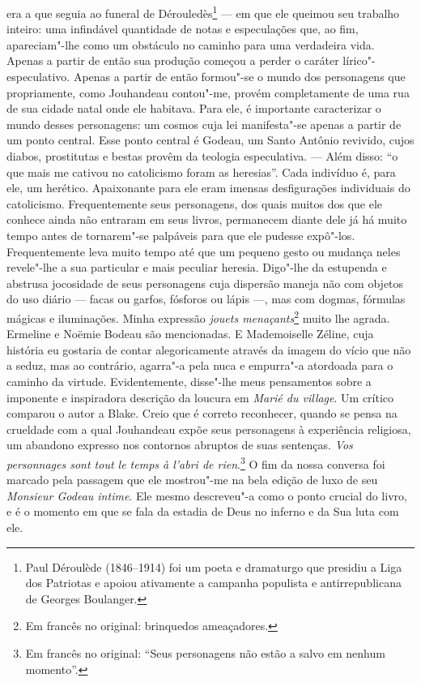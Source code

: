 era a que seguia ao funeral de Dérouledès\footnote{Paul Déroulède
  (1846--1914) foi um poeta e dramaturgo que presidiu a Liga dos Patriotas e apoiou ativamente a campanha populista e
  antirrepublicana de Georges Boulanger. \versal{[N.~O.]}} --- em que ele queimou seu
trabalho inteiro: uma infindável quantidade de notas e especulações que,
ao fim, apareciam"-lhe como um obstáculo no caminho para uma verdadeira
vida. Apenas a partir de então sua produção começou a perder o caráter
lírico"-especulativo. Apenas a partir de então formou"-se o mundo dos
personagens que propriamente, como Jouhandeau contou"-me, provém
completamente de uma rua de sua cidade natal onde ele habitava. Para
ele, é importante caracterizar o mundo desses personagens: um cosmos
cuja lei manifesta"-se apenas a partir de um ponto central. Esse ponto
central é Godeau, um Santo Antônio revivido, cujos diabos, prostitutas e
bestas provêm da teologia especulativa. --- Além disso: ``o que mais me
cativou no catolicismo foram as heresias''. Cada indivíduo é, para ele,
um herético. Apaixonante para ele eram imensas desfigurações individuais
do catolicismo. Frequentemente seus personagens, dos quais muitos dos
que ele conhece ainda não entraram em seus livros, permanecem diante
dele já há muito tempo antes de tornarem"-se palpáveis para que ele
pudesse expô"-los. Frequentemente leva muito tempo até que um pequeno
gesto ou mudança neles revele"-lhe a sua particular e mais peculiar
heresia. Digo"-lhe da estupenda e abstrusa jocosidade de seus personagens
cuja dispersão maneja não com objetos do uso diário --- facas ou garfos,
fósforos ou lápis ---, mas com dogmas, fórmulas mágicas e iluminações.
Minha expressão \emph{jouets menaçants}\footnote{Em francês no original: brinquedos
  ameaçadores. \versal{[N.~T.]}} muito lhe agrada. Ermeline e
Noëmie Bodeau são mencionadas. E Mademoiselle Zéline, cuja história eu
gostaria de contar alegoricamente através da imagem do vício que não a
seduz, mas ao contrário, agarra"-a pela nuca e empurra"-a atordoada para o
caminho da virtude. Evidentemente, disse"-lhe meus pensamentos sobre a
imponente e inspiradora descrição da loucura em \emph{Marié du village}.
Um crítico comparou o autor a Blake. Creio que é correto reconhecer,
quando se pensa na crueldade com a qual Jouhandeau expõe seus
personagens à experiência religiosa, um abandono expresso nos contornos
abruptos de suas sentenças. \emph{Vos personnages sont tout le temps à
l'abri de rien}.\footnote{Em francês no original: ``Seus personagens não estão a salvo em
  nenhum momento''. \versal{[N.~T.]}} O fim da nossa conversa
foi marcado pela passagem que ele mostrou"-me na bela edição de luxo de
seu \emph{Monsieur Godeau intime}. Ele mesmo descreveu"-a como o ponto
crucial do livro, e é o momento em que se fala da estadia de Deus no
inferno e da Sua luta com ele.

